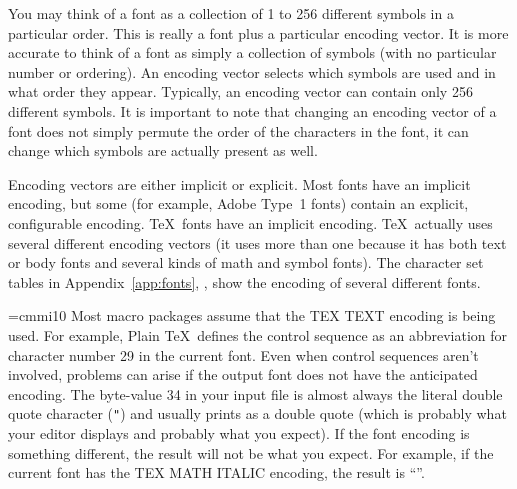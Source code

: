 You may think of a font as a collection of 1 to 256 different
symbols in a particular order.  This is really a font plus a particular
encoding vector.  It is more accurate to think of a font as simply a
collection of symbols (with no particular number or ordering).  An encoding
vector selects which symbols are used and in what order they appear.
Typically, an encoding vector can contain only 256 different symbols.
It is important to note that changing an encoding vector of a font does not
simply permute the order of the characters in the font, it can change which
symbols are actually present as well.

Encoding vectors are either implicit or explicit.  Most fonts have an implicit
encoding, but some (for example, Adobe Type~1 fonts) contain an explicit,
configurable encoding.
\TeX\ fonts have an implicit encoding.  \TeX\ actually uses several different
encoding vectors (it uses more than one because it has both text or body
fonts and several kinds of math and symbol fonts).  The character set tables
in Appendix~\ref{app:fonts}, {\it{}}, show the encoding of
several different fonts.

%
%
%
%
%
%
%
%
%
%

\font\mathit=cmmi10
Most macro packages assume that the TEX TEXT encoding is being used.
For example, Plain \TeX\ defines the control sequence  as
an abbreviation for character number 29 in the current font.  Even
when control sequences aren't involved, problems can arise if the 
output font does not have the anticipated encoding.  The byte-value
34 in your input file is almost always the literal
double quote character  (\verb|"|) and usually prints as a double
quote (which is probably what your editor displays and probably what
you expect).  If the font encoding is something different, the result
will not be what you expect.  For example, if the current font has
the TEX MATH ITALIC encoding, the result is ``{\mathit{}}''.


